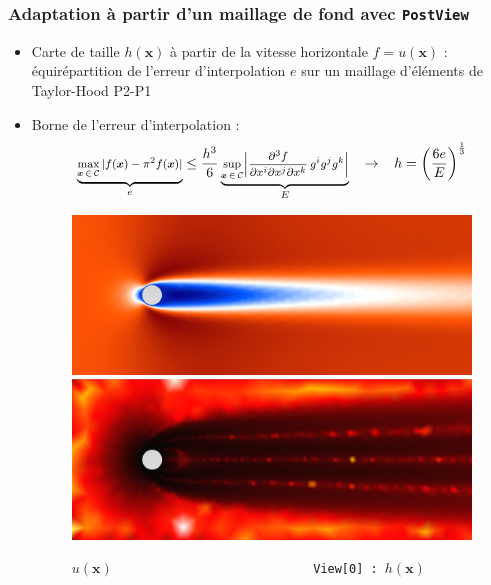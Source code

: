 \documentclass[aspectratio=169]{beamer}
\newcommand{\bfx}[0]{\boldsymbol{x}}
\begin{document}
\begin{frame}[fragile]
\frametitle{Adaptation à partir d'un maillage de fond avec \texttt{PostView}}
\begin{itemize}
  \item Carte de taille $h(\bfx)$ à partir de la vitesse horizontale $f = u(\bfx)$ : équirépartition de l'erreur d'interpolation $e$ sur un maillage d'éléments de Taylor-Hood P2-P1
  \item Borne de l'erreur d'interpolation :
  \begin{equation*}
    \footnotesize
    \underbrace{\max_{\bfx \,\in \,\mathcal{C}} \vert f(\bfx) - \pi^2f(\bfx) \vert}_{e} \leq \frac{h^3}{6} \underbrace{\sup_{\bfx \,\in \,\mathcal{C}} \biggr\vert \frac{\partial^3 f}{\partial x^i \partial x^j \partial x^k} \,g^ig^jg^k \biggr\vert}_{E} ~~~ \rightarrow  ~~~ h = \left(\frac{6e}{E}\right)^{\frac{1}{3}}
  \end{equation*}
  \begin{figure}
    \hspace{-0.8cm}
    \includegraphics[width=0.45\linewidth]{figures/solU_flow.png}
    \hspace{0.5cm}
    \includegraphics[width=0.45\linewidth]{figures/sizefield.png}
    \hspace{0.5cm}
    \caption{\texttt{$u(\bfx)$ ~~~~~~~~~~~~~~~~~~~~~~~~~~ View[0] : $h(\bfx)$}}
    \label{}
  \end{figure}
\end{itemize}
\end{frame}
\end{document}
